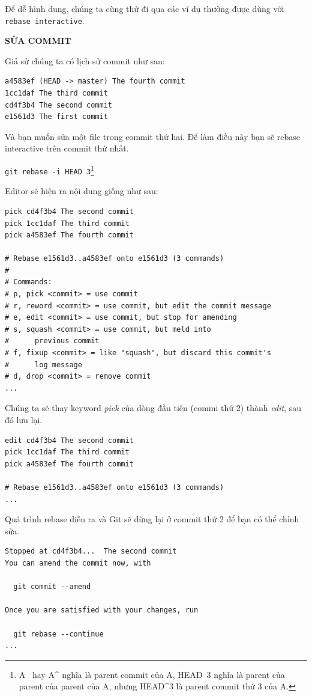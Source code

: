\documentclass[a4paper, 11pt]{article}
\begin{document}
Để dễ hình dung, chúng ta cùng thử đi qua các ví dụ thường được dùng với \texttt{rebase interactive}.

\textit{}

\textbf{SỬA COMMIT}

Giả sử chúng ta có lịch sử commit như sau:

\begin{verbatim}
a4583ef (HEAD -> master) The fourth commit
1cc1daf The third commit
cd4f3b4 The second commit
e1561d3 The first commit
\end{verbatim}

Và bạn muốn sửa một file trong commit thứ hai. Để làm điều này bạn sẽ rebase interactive trên commit thứ nhất.

\texttt{git rebase -i HEAD\string~3}\footnote{A\string~ hay A\string^ nghĩa là parent commit của A, HEAD\string~3 nghĩa là parent của parent của parent của A, nhưng HEAD\string^3 là parent commit thứ 3 của A.}

Editor sẽ hiện ra nội dung giống như sau:

\begin{verbatim}
pick cd4f3b4 The second commit
pick 1cc1daf The third commit
pick a4583ef The fourth commit

# Rebase e1561d3..a4583ef onto e1561d3 (3 commands)
#
# Commands:
# p, pick <commit> = use commit
# r, reword <commit> = use commit, but edit the commit message
# e, edit <commit> = use commit, but stop for amending
# s, squash <commit> = use commit, but meld into 
#      previous commit
# f, fixup <commit> = like "squash", but discard this commit's 
#      log message
# d, drop <commit> = remove commit
...
\end{verbatim}

Chúng ta sẽ thay keyword \textit{pick} của dòng đầu tiên (commi thứ 2) thành \textit{edit}, sau đó lưu lại.

 \begin{verbatim}
edit cd4f3b4 The second commit
pick 1cc1daf The third commit
pick a4583ef The fourth commit

# Rebase e1561d3..a4583ef onto e1561d3 (3 commands)
...
\end{verbatim}

Quá trình rebase diễn ra và Git sẽ dừng lại ở commit thứ 2 để bạn có thể chỉnh sửa. 

\begin{verbatim}
Stopped at cd4f3b4...  The second commit
You can amend the commit now, with

  git commit --amend

Once you are satisfied with your changes, run

  git rebase --continue
...
\end{verbatim}
\end{document}

